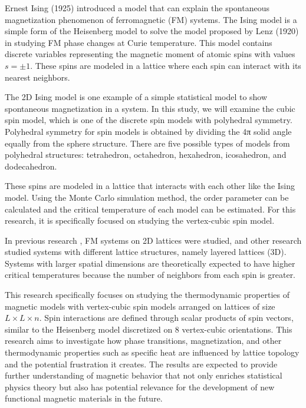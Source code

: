 Ernest Ising (1925) introduced a model that can explain the spontaneous magnetization phenomenon of ferromagnetic (FM) systems. The Ising model is a simple form of the Heisenberg model to solve the model proposed by Lenz (1920) in studying FM phase changes at Curie temperature. This model contains discrete variables representing the magnetic moment of atomic spins with values $s = \pm 1$. These spins are modeled in a lattice where each spin can interact with its nearest neighbors.

The 2D Ising model is one example of a simple statistical model to show spontaneous magnetization in a system. In this study, we will examine the cubic spin model, which is one of the discrete spin models with polyhedral symmetry. Polyhedral symmetry for spin models is obtained by dividing the 4π solid angle equally from the sphere structure. There are five possible types of models from polyhedral structures: tetrahedron, octahedron, hexahedron, icosahedron, and dodecahedron.

These spins are modeled in a lattice that interacts with each other like the Ising model. Using the Monte Carlo simulation method, the order parameter can be calculated and the critical temperature of each model can be estimated. For this research, it is specifically focused on studying the vertex-cubic spin model.

In previous research \cite{Surungan2008}, FM systems on 2D lattices were studied, and other research \cite{Sutiono2013} studied systems with different lattice structures, namely layered lattices (3D). Systems with larger spatial dimensions are theoretically expected to have higher critical temperatures because the number of neighbors from each spin is greater.

This research specifically focuses on studying the thermodynamic properties of magnetic models with vertex-cubic spin models arranged on lattices of size $L \times L \times n$. Spin interactions are defined through scalar products of spin vectors, similar to the Heisenberg model discretized on 8 vertex-cubic orientations. This research aims to investigate how phase transitions, magnetization, and other thermodynamic properties such as specific heat are influenced by lattice topology and the potential frustration it creates. The results are expected to provide further understanding of magnetic behavior that not only enriches statistical physics theory but also has potential relevance for the development of new functional magnetic materials in the future. 